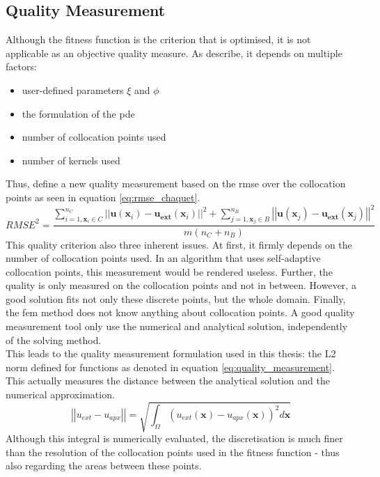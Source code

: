 \documentclass[./\jobname.tex]{subfiles}
\begin{document}
\subsection{Quality Measurement}
\label{chap:metric_quality}
Although the fitness function is the criterion that is optimised, it is not applicable as an objective quality measure. As \cite{chaquet_using_2019} describe, it depends on multiple factors:
\begin{itemize}
	\item user-defined parameters $\xi$ and $\phi$ 
	\item the formulation of the \gls{pde} 
	\item number of collocation points used 
	\item number of kernels used
\end{itemize}
Thus, \cite{chaquet_using_2019} define a new quality measurement based on the \gls{rmse} over the collocation points as seen in equation \ref{eq:rmse_chaquet}. 
\begin{equation}
\label{eq:rmse_chaquet}
RMSE^2 = \frac{\sum_{i=1, \mathbf{x}_i \in C}^{n_C} \left|\left| \mathbf{u}(\mathbf{x}_i) - \mathbf{u_{ext}}(\mathbf{x}_i) \right|\right|^2 + \sum_{j=1, \mathbf{x}_j \in B}^{n_B} \left|\left| \mathbf{u}(\mathbf{x}_j) - \mathbf{u_{ext}}(\mathbf{x}_j) \right|\right|^2}{m(n_C + n_B)}
\end{equation}
This quality criterion also three inherent issues. At first, it firmly depends on the number of collocation points used. In an algorithm that uses self-adaptive collocation points, this measurement would be rendered useless. Further, the quality is only measured on the collocation points and not in between. However, a good solution fits not only these discrete points, but the whole domain. Finally, the \gls{fem} method does not know anything about collocation points. A good quality measurement tool only use the numerical and analytical solution, independently of the solving method. \\

This leads to the quality measurement formulation used in this thesis: the L2 norm defined for functions as denoted in equation \ref{eq:quality_measurement}. This actually measures the distance between the analytical solution and the numerical approximation.  
\begin{equation}
\label{eq:quality_measurement}
\left|\left|u_{ext} - u_{apx}\right|\right| = \sqrt{\int_{\Omega} (u_{ext}(\mathbf{x}) - u_{apx}(\mathbf{x}))^2 d\mathbf{x}}
\end{equation}
Although this integral is numerically evaluated, the discretisation is much finer than the resolution of the collocation points used in the fitness function - thus also regarding the areas between these points.
\end{document}
